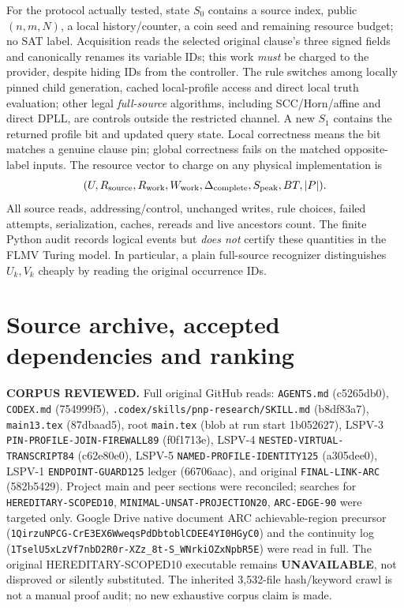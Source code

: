 \documentclass[11pt]{article}
\begin{document}
For the protocol actually tested, state \(S_0\) contains a source index, public \((n,m,N)\), a local history/counter, a coin seed and remaining resource budget; no SAT label. Acquisition reads the selected original clause's three signed fields and canonically renames its variable IDs; this work \emph{must} be charged to the provider, despite hiding IDs from the controller. The rule switches among locally pinned child generation, cached local-profile access and direct local truth evaluation; other legal \emph{full-source} algorithms, including SCC/Horn/affine and direct DPLL, are controls outside the restricted channel. A new \(S_1\) contains the returned profile bit and updated query state. Local correctness means the bit matches a genuine clause pin; global correctness fails on the matched opposite-label inputs. The resource vector to charge on any physical implementation is
\[
(U,R_{\rm source},R_{\rm work},W_{\rm work},
\Delta_{\rm complete},S_{\rm peak},BT,|P|).
\]
All source reads, addressing/control, unchanged writes, rule choices, failed attempts, serialization, caches, rereads and live ancestors count. The finite Python audit records logical events but \emph{does not} certify these quantities in the FLMV Turing model. In particular, a plain full-source recognizer distinguishes \(U_k,V_k\) cheaply by reading the original occurrence IDs.

\section*{Source archive, accepted dependencies and ranking}
\noindent\textbf{CORPUS REVIEWED.} Full original GitHub reads: \texttt{AGENTS.md} (c5265db0), \texttt{CODEX.md} (754999f5), \texttt{.codex/skills/pnp-research/SKILL.md} (b8df83a7), \texttt{main13.tex} (87dbaad5), root \texttt{main.tex} (blob at run start 1b052627), LSPV-3 \texttt{PIN-PROFILE-JOIN-FIREWALL89} (f0f1713e), LSPV-4 \texttt{NESTED-VIRTUAL-TRANSCRIPT84} (c62e80e0), LSPV-5 \texttt{NAMED-PROFILE-IDENTITY125} (a305dee0), LSPV-1 \texttt{ENDPOINT-GUARD125} ledger (66706aac), and original \texttt{FINAL-LINK-ARC} (582b5429). Project main and peer sections were reconciled; searches for \texttt{HEREDITARY-SCOPED10}, \texttt{MINIMAL-UNSAT-PROJECTION20}, \texttt{ARC-EDGE-90} were targeted only. Google Drive native document ARC achievable-region precursor (\texttt{1QirzuNPCG-CrE3EX6WweqsPdDbtoblCDEE4YI0HGyC0}) and the continuity log (\texttt{1TselU5xLzVf7nbD2R0r-XZz_8t-S_WNrkiOZxNpbR5E}) were read in full. The original HEREDITARY-SCOPED10 executable remains \textbf{UNAVAILABLE}, not disproved or silently substituted. The inherited 3,532-file hash/keyword crawl is not a manual proof audit; no new exhaustive corpus claim is made.
\end{document}
